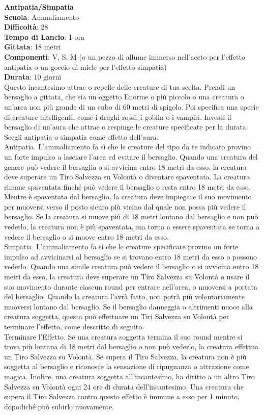 \begin{multicols}{2}
\medskip\textbf{Antipatia/Simpatia}\\
\textbf{Scuola}: Ammaliamento\\
\textbf{Difficoltà}: 28\\
\textbf{Tempo di Lancio}: 1 ora\\
\textbf{Gittata}: 18 metri\\
\textbf{Componenti}: V, S, M (o un pezzo di allume immerso nell'aceto per l'effetto antipatia o un goccio di miele per l'effetto simpatia)\\
\textbf{Durata}: 10 giorni\\
Questo incantesimo attrae o repelle delle creature di tua scelta. Prendi un bersaglio a gittata, che sia un oggetto Enorme o più piccolo o una creatura o un'area non più grande di un cubo di 60 metri di spigolo. Poi specifica una specie di creature intelligenti, come i draghi rossi, i goblin o i vampiri. Investi il bersaglio di un'aura che attrae o respinge le creature specificate per la durata. Scegli antipatia o simpatia come effetto dell'aura.\\
Antipatia. L'ammaliamento fa sì che le creature del tipo da te indicato provino un forte impulso a lasciare l'area ed evitare il bersaglio. Quando una creatura del genere può vedere il bersaglio o si avvicina entro 18 metri da esso, la creatura deve superare un Tiro Salvezza su Volontà o diventare spaventata. La creatura rimane spaventata finché può vedere il bersaglio o resta entro 18 metri da esso. Mentre è spaventata dal bersaglio, la creatura deve impiegare il suo movimento per muoversi verso il posto sicuro più vicino dal quale non possa più vedere il bersaglio. Se la creatura si muove più di 18 metri lontano dal bersaglio e non può vederlo, la creatura non è più spaventata, ma torna a essere spaventata se torna a vedere il bersaglio o si muove entro 18 metri da esso.\\
Simpatia. L'ammaliamento fa sì che le creature specificate provino un forte impulso ad avvicinarsi al bersaglio se si trovano entro 18 metri da esso o possono vederlo. Quando una simile creatura può vedere il bersaglio o si avvicina entro 18 metri da esso, la creatura deve superare un Tiro Salvezza su Volontà o usare il suo movimento durante ciascun round per entrare nell'area, o muoversi a portata del bersaglio. Quando la creatura l'avrà fatto, non potrà più volontariamente muoversi lontano dal bersaglio. Se il bersaglio danneggia o altrimenti nuoce alla creatura soggetta, questa può effettuare un Tiri Salvezza su Volontà per terminare l'effetto, come descritto di seguito.\\
Terminare l'Effetto. Se una creatura soggetta termina il suo round mentre si trova più lontana di 18 metri dal bersaglio o non può vederlo, la creatura effettua un Tiro Salvezza su Volontà. Se supera il Tiro Salvezza, la creatura non è più soggetta al bersaglio e riconosce la sensazione di ripugnanza o attrazione come magica. Inoltre, una creatura soggetta all'incantesimo, ha diritto a un altro Tiro Salvezza su Volontà ogni 24 ore di durata dell'incantesimo. Una creatura che supera il Tiro Salvezza contro questo effetto è immune a esso per 1 minuto, dopodiché può subirlo nuovamente.


\end{multicols}
